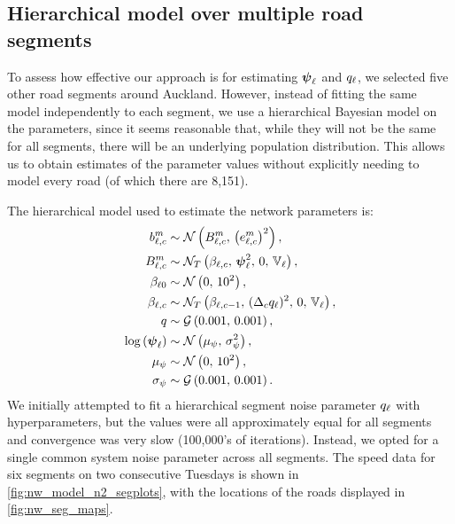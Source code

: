 \subsection{Hierarchical model over multiple road segments}
\label{sec:nw_par_est_multiple}



To assess how effective our approach is for estimating $\mathbf{\boldsymbol{\psi}}_\ell$ and $q_\ell$, we selected five other road segments around Auckland. However, instead of fitting the same model independently to each segment,  we use a hierarchical Bayesian model on the parameters, since it seems reasonable that, while they will not be the same for all segments, there will be an underlying population distribution. This allows us to obtain estimates of the parameter values without explicitly needing to model every road (of which there are 8,151).


The hierarchical model used to estimate the network parameters is:
\begin{equation}
\label{eq:tt_hist_hier}
\begin{split}
b_{\ell,c}^m &\sim \mathcal{N}\left(B_{\ell,c}^m,\, \left(e_{\ell,c}^m\right)^2\right), \\
B_{\ell,c}^m &\sim \mathcal{N}_T\left(\beta_{\ell,c},\, \mathbf{\boldsymbol{\psi}}_{\ell}^2,\, 0,\, \mathbb{V}_\ell\right), \\
\beta_{\ell0} &\sim \mathcal{N}\left(0,\, 10^2\right), \\
\beta_{\ell,c} &\sim \mathcal{N}_T\left(\beta_{\ell,c-1},\, (\Delta_c q_{\ell})^2,\, 0,\, \mathbb{V}_\ell\right), \\
q &\sim \mathcal{G}\left(0.001,\, 0.001\right), \\
\log\left(\mathbf{\boldsymbol{\psi}}_{\ell}\right) &\sim \mathcal{N}\left(\mu_\psi,\, \sigma_\psi^2\right), \\
\mu_\psi &\sim \mathcal{N}\left(0,\, 10^2\right), \\
\sigma_\psi &\sim \mathcal{G}\left(0.001,\, 0.001\right).
\end{split}
\end{equation}
We initially attempted to fit a hierarchical segment noise parameter $q_{\ell}$ with hyperparameters, but the values were all approximately equal for all segments and convergence was very slow (100,000's of iterations). Instead, we opted for a single common system noise parameter across all segments. The speed data for six segments on two consecutive Tuesdays is shown in \cref{fig:nw_model_n2_segplots}, with the locations of the roads displayed in \cref{fig:nw_seg_maps}.

